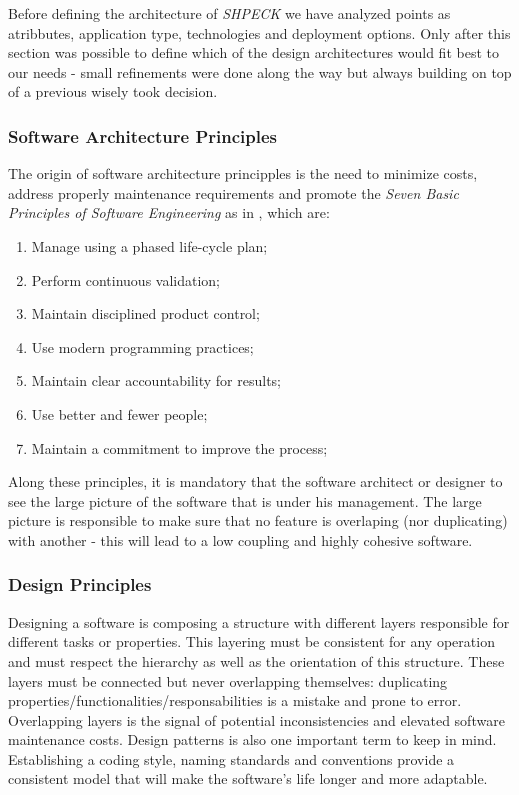 \documentclass[ppgc,mestrado,english]{iiufrgs}
\begin{document}
Before defining the architecture of \emph{SHPECK} we have analyzed points as atribbutes, application type, technologies and deployment options. Only after this section was possible to define which of the design architectures would fit best to our needs - small refinements were done along the way but always building on top of a previous wisely took decision.

\subsubsection{Software Architecture Principles}
The origin of software architecture principples is the need to minimize costs, address properly maintenance requirements and promote the \emph{Seven Basic Principles of Software Engineering} as in \cite{Boehm:83}, which are:
\begin{enumerate}
\item Manage using a phased life-cycle plan;
\item Perform continuous validation;
\item Maintain disciplined product control;
\item Use modern programming practices;
\item Maintain clear accountability for results;
\item Use better and fewer people;
\item Maintain a commitment to improve the process;
\end{enumerate}
Along these principles, it is mandatory that the software architect or designer to see the large picture of the software that is under his management. The large picture is responsible to make sure that no feature is overlaping (nor duplicating) with another - this will lead to a low coupling and highly cohesive software. 

\subsubsection{Design Principles}
Designing a software is composing a structure with different layers responsible for different tasks or properties. This layering must be consistent for any operation and must respect the hierarchy as well as the orientation of this structure. 
These layers must be connected but never overlapping themselves: duplicating properties/functionalities/responsabilities is a mistake and prone to error. Overlapping layers is the signal of potential inconsistencies and elevated software maintenance costs. Design patterns is also one important term to keep in mind. Establishing a coding style, naming standards and conventions provide a consistent model that will make the software's life longer and more adaptable.
\end{document}
